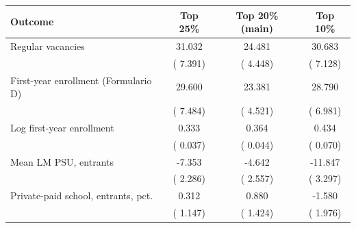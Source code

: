 \begin{tabular}{lccc}
\toprule
Outcome & Top 25\% & Top 20\% (main) & Top 10\% \\
\midrule
Regular vacancies &  31.032\sym{***} &  24.481\sym{***} &  30.683\sym{***} \\
 & ( 7.391) & ( 4.448) & ( 7.128) \\
First-year enrollment (Formulario D) &  29.600\sym{***} &  23.381\sym{***} &  28.790\sym{***} \\
 & ( 7.484) & ( 4.521) & ( 6.981) \\
Log first-year enrollment &   0.333\sym{***} &   0.364\sym{***} &   0.434\sym{***} \\
 & ( 0.037) & ( 0.044) & ( 0.070) \\
Mean LM PSU, entrants &  -7.353\sym{***} &  -4.642\sym{*} & -11.847\sym{***} \\
 & ( 2.286) & ( 2.557) & ( 3.297) \\
Private-paid school, entrants, pct. &   0.312 &   0.880 &  -1.580 \\
 & ( 1.147) & ( 1.424) & ( 1.976) \\
\bottomrule
\end{tabular}
